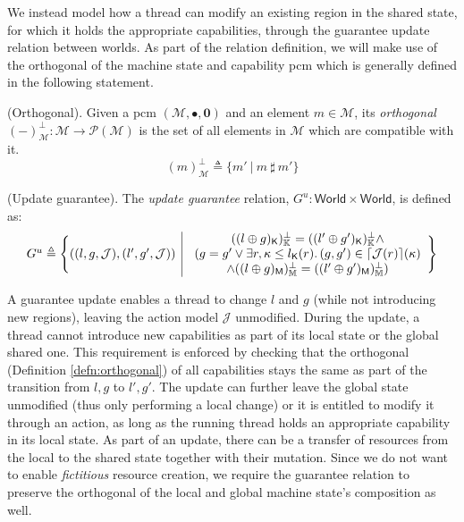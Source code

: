 We instead model how a thread can modify an existing region in the shared state, for which it holds the appropriate capabilities, through the guarantee update relation between worlds. As part of the relation definition, we will make use of the orthogonal of the machine state and capability pcm which is generally defined in the following statement.

\begin{defn}
	\label{defn:orthogonal}
	(Orthogonal).
	Given a pcm $(\mathcal{M}, \bullet, \mathbf{0})$ and an element $m \in \mathcal{M}$, its \emph{orthogonal} $(-)^\bot_\mathcal{M} : \mathcal{M} \rightarrow \mathcal{P}(\mathcal{M})$ is the set of all elements in $\mathcal{M}$ which are compatible with it.
\[
	(m)^\bot_\mathcal{M} \triangleq \{m'\ |\ m\ \sharp\ m' \}
\]
\end{defn}

\begin{defn}
	(Update guarantee).
	The \emph{update guarantee} relation, $G^u : \mathsf{World} \times \mathsf{World}$, is defined as:
	\[
	\begin{array}{r | l}
		G^u \triangleq \Bigg\{ ((l, g, \mathcal{J}), (l', g', \mathcal{J}))
		&
		\begin{array}{c}
			((l \oplus g)_\mathsf{K})_\mathbb{K}^\bot = ((l' \oplus g')_\mathsf{K})_\mathbb{K}^\bot \land \\
			(g = g' \lor \exists r, \kappa \leq l_\mathsf{K}(r) \ldotp (g, g') \in \lceil \mathcal{J}(r) \rceil(\kappa)  \\ \land ((l \oplus g)_\mathsf{M})_\mathbb{M}^\bot = ((l' \oplus g')_\mathsf{M})_\mathbb{M}^\bot )
		\end{array}
		\Bigg\}
	\end{array}
	\]
\end{defn}
A guarantee update enables a thread to change $l$ and $g$ (while not introducing new regions), leaving the action model $\mathcal{J}$ unmodified. During the update, a thread cannot introduce new capabilities as part of its local state or the global shared one. This requirement is enforced by checking that the orthogonal (Definition \ref{defn:orthogonal}) of all capabilities stays the same as part of the transition from $l, g$ to $l', g'$. The update can further leave the global state unmodified (thus only performing a local change) or it is entitled to modify it through an action, as long as the running thread holds an appropriate capability in its local state. As part of an update, there can be a transfer of resources from the local to the shared state together with their mutation. Since we do not want to enable \textit{fictitious} resource creation, we require the guarantee relation to preserve the orthogonal of the local and global machine state's composition as well.

